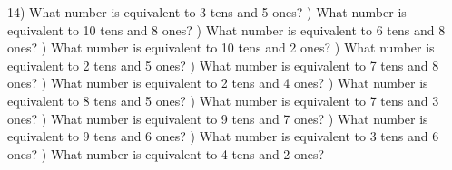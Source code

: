 \documentclass{article}%
\begin{document}
14) What number is equivalent to 3 tens and 5 ones?%
\newline%
\newline%
) What number is equivalent to 10 tens and 8 ones?%
\newline%
\newline%
) What number is equivalent to 6 tens and 8 ones?%
\newline%
\newline%
) What number is equivalent to 10 tens and 2 ones?%
\newline%
\newline%
) What number is equivalent to 2 tens and 5 ones?%
\newline%
\newline%
) What number is equivalent to 7 tens and 8 ones?%
\newline%
\newline%
) What number is equivalent to 2 tens and 4 ones?%
\newline%
\newline%
) What number is equivalent to 8 tens and 5 ones?%
\newline%
\newline%
) What number is equivalent to 7 tens and 3 ones?%
\newline%
\newline%
) What number is equivalent to 9 tens and 7 ones?%
\newline%
\newline%
) What number is equivalent to 9 tens and 6 ones?%
\newline%
\newline%
) What number is equivalent to 3 tens and 6 ones?%
\newline%
\newline%
) What number is equivalent to 4 tens and 2 ones?%
\newline%
\newline%
\newline%
\end{document}
